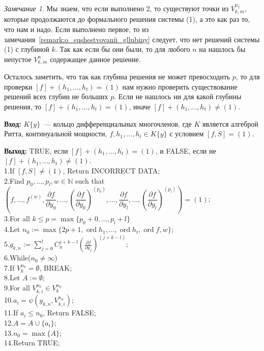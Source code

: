\documentclass[16pt]{article}
\DeclareMathOperator{\ord}{ord}
\renewcommand{\le}{\leqslant} %
\theoremstyle{plain1}
\theoremstyle{plain2}
\theoremstyle{plain}
\theoremstyle{plain3}
\theoremstyle{definition}
\theoremstyle{remark}
\newtheorem{remark}[theorem1]{Замечание}
\begin{document}
\begin{remark}
Мы знаем, что если выполнено 2, то существуют точки из ${V}_{k,m}^{n_j}$, которые продолжаются до формального решения системы (1), а это как раз то, что нам и надо. Если выполнено первое, то из замечания~\ref{remark:o_sushestvovanii_gllubiny} следует, что нет решений системы (1)  с глубиной $k$. Так как если бы они были, то для любого $n$ на нашлось бы непустое ${V}_{k,m}^{n}$ содержащее данное решение.

Осталось заметить, что так как глубина решения не может превосходить $p$, то для проверки $[f]+(h_1,\ldots,h_t)=(1)$ нам нужно проверить существование решений всех глубин не больших $p$. Если не нашлось ни для какой глубины решения, то $[f]+(h_1,\ldots,h_t)=(1)$, иначе $[f]+(h_1,\ldots,h_t)\neq(1)$.
\end{remark}

{\bf Вход:} $K\{y\}$~--- кольцо дифференциальных многочленов, где $K$ является алгеброй Ритта, континуальной мощности, $f,h_1,\ldots,h_t \in K\{y\}$ с условием $[f,S]=(1)$.

{\bf Выход:} TRUE, если  $[f]+(h_1,\ldots,h_t)=(1)$, и FALSE, если не $[f]+(h_1,\ldots,h_t)\not=(1)$.
\\
1.\qquad If $[f,S]\not=(1)$, Return  INCORRECT DATA;\\
2.\qquad Find $p_0, \ldots, p_l, w\in \mathbb{N}$ such that $\left(f,\ldots, f^{(w)}, \dfrac{\partial f}{\partial y_0},\ldots,(\dfrac{\partial f}{\partial y_0})^{(p_0)},\ldots, \dfrac{\partial f}{\partial y_l},\ldots,(\dfrac{\partial f}{\partial y_l})^{(p_l)}\right)=(1)$;\\
3.\qquad For all $k\le p =\max\{ p_0+0,\ldots,p_l+l\} $\\
4.\qquad\qquad Let $n_0:=\max\{ 2p+1,\ord{h_1},\ldots, \ord{h_t},\ord{f},w\}$;\\
5.\qquad\qquad $g_{k,n}:=\sum\limits_{j=0}^{l}C_n^{j+k - l }\left(\frac{\partial f}{\partial y_j}\right)^{(j+k - l)}$;\\
6.\qquad\qquad While($n_0\not=\infty$)\\
7.\qquad\qquad\qquad If $V_k^{n_0}=\emptyset$, BREAK;\\
8.\qquad\qquad\qquad Let $A:=\emptyset$;\\
9.\qquad\qquad\qquad For all ${V}_{k,i}^{n_0}\in V_k^{n_0}$\\
10.\qquad\qquad\qquad\qquad $a_i=\psi(g_{k,n},{V}_{k,i}^{n_0})$;\\
11.\qquad\qquad\qquad\qquad If $a_i\le n_0$, Return FALSE;\\
12.\qquad\qquad\qquad\qquad $A=A\cup\{a_i\}$;\\
13.\qquad\qquad\qquad $n_0=\max\{A\}$;\\
14.\qquad Return TRUE;
\end{document}
